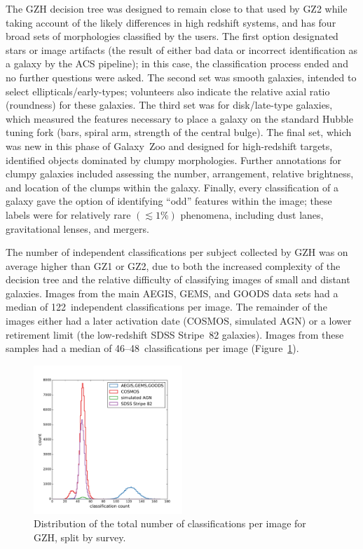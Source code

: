 \documentclass[twocolumn]{aastex6}
\begin{document}
The GZH decision tree was designed to remain close to that used by GZ2 while
taking account of the likely differences in high redshift systems, and has four
broad sets of morphologies classified by the users.  The first option
designated stars or image artifacts (the result of either bad data or incorrect
identification as a galaxy by the ACS pipeline); in this case, the
classification process ended and no further questions were asked. The second
set was smooth galaxies, intended to select ellipticals/early-types;
volunteers also indicate the relative axial ratio (roundness) for these
galaxies. The third set was for disk/late-type galaxies, which measured the
features necessary to place a galaxy on the standard Hubble tuning fork (bars,
spiral arm, strength of the central bulge). The final set, which was new in
this phase of Galaxy~Zoo and designed for high-redshift targets, identified
objects dominated by clumpy morphologies. Further annotations for clumpy
galaxies included assessing the number, arrangement, relative brightness, and
location of the clumps within the galaxy. Finally, every classification of a
galaxy gave the option of identifying ``odd'' features within the image; these
labels were for relatively rare $(\lesssim1\%)$ phenomena, including dust
lanes, gravitational lenses, and mergers. 

The number of independent classifications per subject collected by GZH was on
average higher than GZ1 or GZ2, due to both the increased complexity of the
decision tree and the relative difficulty of classifying images of small and
distant galaxies. Images from the main AEGIS, GEMS, and GOODS data sets had a
median of 122~independent classifications per image. The remainder of the
images either had a later activation date (COSMOS, simulated AGN) or a lower
retirement limit (the low-redshift SDSS Stripe~82 galaxies). Images from these
samples had a median of 46--48~classifications per image
(Figure~\ref{fig:classification_hist}).

\begin{figure}
\center
\includegraphics[width=0.5\textwidth]{figures/classification_hist.pdf}
\caption{Distribution of the total number of classifications per image for GZH,
split by survey.}
\label{fig:classification_hist}
\end{figure}
\end{document}
